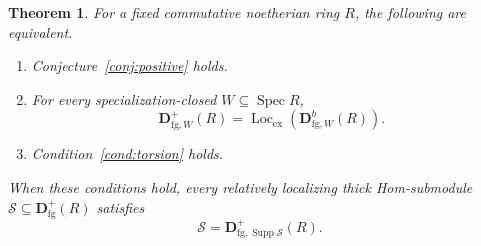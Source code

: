 \documentclass[11pt]{amsart}
\numberwithin{equation}{section}
\newtheorem{theorem}{Theorem}[section]
\theoremstyle{definition}
\theoremstyle{remark}
\DeclareMathOperator{\Supp}{Supp}
\DeclareMathOperator{\Spec}{Spec}
\DeclareMathOperator{\Loc}{Loc}
\newcommand{\D}{\mathbf D}
\newcommand{\fg}{\mathrm{fg}}
\newcommand{\Lex}{\Loc_{\mathrm{ex}}}
\begin{document}
\begin{theorem}\label{thm:equivalence}
For a fixed commutative noetherian ring $R$, the following are equivalent.
\begin{enumerate}[label=(\roman*),leftmargin=*]
\item Conjecture~\ref{conj:positive} holds.
\item For every specialization-closed $W\subseteq\Spec R$,
\begin{equation}\label{eq:all-geometry}
 \D^+_{\fg,W}(R)=\Lex(\D^b_{\fg,W}(R)).
\end{equation}
\item Condition~\ref{cond:torsion} holds.
\end{enumerate}
When these conditions hold, every relatively localizing thick
Hom-submodule $\mathcal S\subseteq\D^+_{\fg}(R)$ satisfies
\begin{equation}\label{eq:all-classification}
 \mathcal S=\D^+_{\fg,\Supp\mathcal S}(R).
\end{equation}
\end{theorem}
\end{document}
